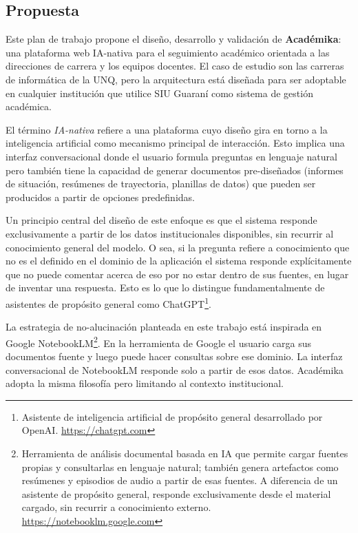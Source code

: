 \documentclass[
  spanish,
]{article}
\begin{document}
\subsection{Propuesta}\label{la-propuesta}

Este plan de trabajo propone el diseño, desarrollo y validación de
\textbf{Académika}: una plataforma web IA-nativa para el seguimiento
académico orientada a las direcciones de carrera y los equipos docentes.
El caso de estudio son las carreras de informática de la UNQ, pero
la arquitectura está diseñada para ser adoptable en cualquier institución
que utilice SIU Guaraní como sistema de gestión académica.

El término \emph{IA-nativa} refiere a una plataforma cuyo diseño gira en torno a la inteligencia artificial
como mecanismo principal de interacción. Esto implica una interfaz conversacional donde el usuario
formula preguntas en lenguaje natural pero también tiene la capacidad de generar documentos pre-diseñados
(informes de situación, resúmenes de trayectoria, planillas de datos) que pueden ser producidos
a partir de opciones predefinidas. 

Un principio central del diseño de este enfoque es que el sistema responde
exclusivamente a partir de los datos institucionales disponibles,
sin recurrir al conocimiento general del modelo. O sea, si la pregunta refiere
a conocimiento que no es el definido en el dominio de la aplicación el sistema
responde explícitamente que no puede comentar acerca de eso por no estar dentro de sus fuentes,
en lugar de inventar una respuesta. Esto es lo que lo distingue fundamentalmente de asistentes
de propósito general como ChatGPT\footnote{Asistente de inteligencia artificial de propósito general desarrollado por OpenAI. \url{https://chatgpt.com}}.

La estrategia de no-alucinación planteada en este trabajo está inspirada en Google
NotebookLM\footnote{Herramienta de análisis
documental basada en IA que permite cargar fuentes propias y consultarlas en lenguaje natural;
también genera artefactos como resúmenes y episodios de audio a partir de esas fuentes.
A diferencia de un asistente de propósito general, responde exclusivamente desde el material
cargado, sin recurrir a conocimiento externo. \url{https://notebooklm.google.com}}.
En la herramienta de Google el usuario carga sus documentos fuente y luego puede hacer consultas
sobre ese dominio. La interfaz conversacional de NotebookLM responde solo a partir de esos datos.
Académika adopta la misma filosofía pero limitando al contexto institucional.
\end{document}
